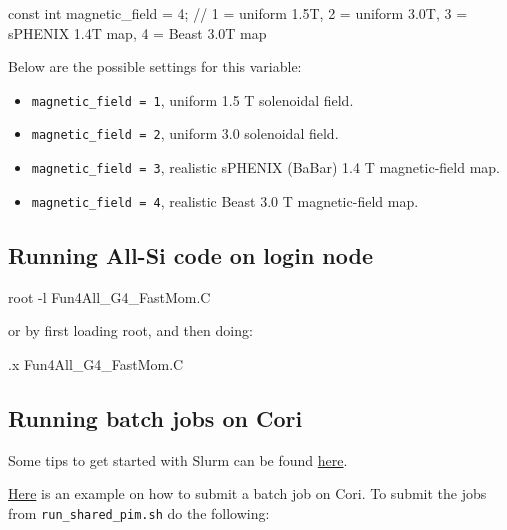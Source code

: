 \documentclass[12pt]{article}
\begin{document}
\begin{tcolorbox}
\begin{verbnobox}[\scriptsize]
const int magnetic_field = 4;   // 1 = uniform 1.5T, 2 = uniform 3.0T, 3 = sPHENIX 1.4T map, 4 = Beast 3.0T map
\end{verbnobox}
\end{tcolorbox}

Below are the possible settings for this variable:

\begin{itemize}
\item \verb|magnetic_field = 1|, uniform 1.5 T solenoidal field.
\item \verb|magnetic_field = 2|, uniform 3.0 solenoidal field.
\item \verb|magnetic_field = 3|, realistic sPHENIX (BaBar) 1.4 T magnetic-field map.
\item \verb|magnetic_field = 4|, realistic Beast 3.0 T magnetic-field map.
\end{itemize}


\subsection{Running All-Si code on login node}

\begin{tcolorbox}
\begin{verbnobox}[\scriptsize]
root -l Fun4All_G4_FastMom.C
\end{verbnobox}
\end{tcolorbox}

or by first loading root, and then doing:

\begin{tcolorbox}
\begin{verbnobox}[\scriptsize]
.x Fun4All_G4_FastMom.C
\end{verbnobox}
\end{tcolorbox}

\subsection{Running batch jobs on Cori}

Some tips to get started with Slurm can be found \href{https://slurm.schedmd.com/quickstart.html}{here}.

\href{https://github.com/eic/g4lblvtx/tree/master/cori_batch}{Here} is an example on how to submit a batch job on Cori.
To submit the jobs from \verb|run_shared_pim.sh| do the following:
\end{document}
